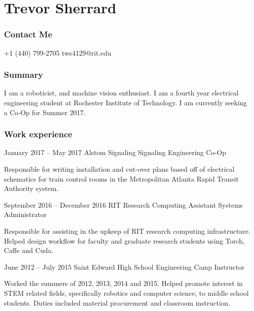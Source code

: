 \documentclass{tccv}
\begin{document}
\part{Trevor Sherrard}
\section{Contact Me}
\begin{eventlist}
    {+1 (440) 799-2705}
    {tws4129@rit.edu}
    
\end{eventlist}

\section{Summary}
I am a roboticist, and machine vision enthusiast. I am a fourth year electrical engineering student at Rochester Institute of Technology. I am currently seeking a Co-Op for Summer 2017. 

\section{Work experience}

\begin{eventlist}

\item{January 2017 -- May 2017}
     {Alstom Signaling}
     {Signaling Engineering Co-Op}

Responsible for writing installation and cut-over plans based off of electrical schematics for train control rooms in the Metropolitan Atlanta Rapid Transit Authority system.

\item{September 2016 -- December 2016}
	 {RIT Research Computing}
	 {Assistant Systems Administrator}
	 
Responsible for assisting in the upkeep of RIT research computing infrastructure. Helped design workflow for faculty and graduate research students using Torch, Caffe and Cuda. 


\item{June 2012 -- July 2015}
     {Saint Edward High School}
     {Engineering Camp Instructor}
     
Worked the summers of 2012, 2013, 2014 and 2015. Helped promote interest in STEM related fields, specifically robotics and computer science, to middle school students. Duties included material procurement and classroom instruction.
\end{eventlist}
\end{document}
